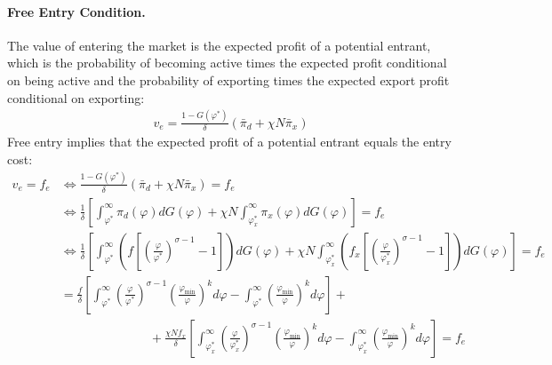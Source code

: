 \begin{solution}
	\paragraph{Free Entry Condition.} The value of entering the market is the expected profit of a potential entrant, which is the probability of becoming active times the expected profit conditional on being active and the probability of exporting times the expected export profit conditional on exporting:
	\begin{align*}
		v_e = \frac{1 - G(\varphi^*)}{\delta} \left( \bar{\pi}_d + \chi N \bar{\pi}_x \right)
	\end{align*}
	Free entry implies that the expected profit of a potential entrant equals the entry cost:
	\begin{align*}
		v_e = f_e &\iff \frac{1 - G(\varphi^*)}{\delta} \left( \bar{\pi}_d + \chi N \bar{\pi}_x \right) = f_e\\
		&\iff \frac{1}{\delta} \left[ \int_{\varphi^*}^{\infty} \pi_d(\varphi) dG(\varphi) + \chi N \int_{\varphi_x^*}^{\infty} \pi_x(\varphi) dG(\varphi) \right] = f_e\\
		&\iff \frac{1}{\delta} \left[ \int_{\varphi^*}^{\infty} \left( f \left[ \left(\frac{\varphi}{\varphi^*}\right)^{\sigma - 1} - 1 \right] \right) dG(\varphi) + \chi N \int_{\varphi_x^*}^{\infty} \left( f_x \left[ \left(\frac{\varphi}{\varphi_x^*}\right)^{\sigma - 1} - 1 \right] \right) dG(\varphi) \right] = f_e \\
		&= \frac{f}{\delta} \left[ \int_{\varphi^*}^{\infty} \left(\frac{\varphi}{\varphi^*}\right)^{\sigma - 1} \left(\frac{\varphi_{\min}}{\varphi}\right)^k d\varphi - \int_{\varphi^*}^{\infty} \left(\frac{\varphi_{\min}}{\varphi}\right)^k d\varphi \right] + \\
		&\hspace{3cm} + \frac{\chi N f_x}{\delta} \left[ \int_{\varphi_x^*}^{\infty} \left(\frac{\varphi}{\varphi_x^*}\right)^{\sigma - 1} \left(\frac{\varphi_{\min}}{\varphi}\right)^k d\varphi - \int_{\varphi_x^*}^{\infty} \left(\frac{\varphi_{\min}}{\varphi}\right)^k d\varphi \right] = f_e
	\end{align*}
\end{solution}